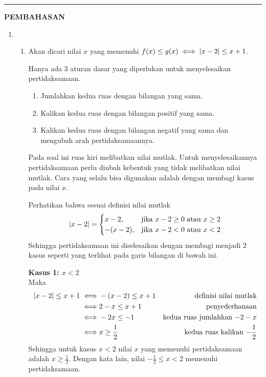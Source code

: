 \vspace{0.2cm}\hrule height 1pt\vspace{0.5cm}


\begin{center}
    \textbf{\large{PEMBAHASAN}}
\end{center}
\begin{enumerate}[leftmargin=*, label={\arabic*}.]
\item
    \begin{enumerate}[label={\alph*}.]
    \item Akan dicari nilai $x$ yang memenuhi
    $f(x) \leq g(x) \iff \lvert x-2\rvert \leq x+1$.

    Hanya ada 3 aturan dasar yang diperlukan untuk menyelesaikan pertidaksamaan.
        \begin{enumerate}[label={\arabic*})]
        \item Jumlahkan kedua ruas dengan bilangan yang sama.
        \item Kalikan kedua ruas dengan bilangan positif yang sama.
        \item Kalikan kedua ruas dengan bilangan negatif yang sama dan 
        mengubah arah pertidaksamaannya.
        \end{enumerate}
    Pada soal ini ruas kiri melibatkan nilai mutlak. Untuk menyelesaikannya 
    pertidaksamaan perlu diubah kebentuk yang tidak melibatkan nilai mutlak. 
    Cara yang selalu bisa digunakan adalah dengan membagi kasus pada nilai $x$.
    
    Perhatikan bahwa sesuai definisi nilai mutlak
    \[
    \lvert x-2\rvert = 
    \begin{cases}
        x-2, &\text{jika $x-2 \geq 0$ atau $x \geq 2$}\\
        -(x-2), &\text{jika $x-2 < 0$ atau $x < 2$}
    \end{cases}
    \]
    Sehingga pertidaksamaan ini diselesaikan dengan membagi menjadi 2 kasus 
    seperti yang terlihat pada garis bilangan di bawah ini.
    
    

    \textbf{Kasus 1: $x < 2$}\\
    Maka
    \begin{align*}
        \lvert x-2\rvert \leq x+1
        \iff &-(x-2) \leq x+1 
        &\text{definisi nilai mutlak} \\
        \iff &2-x \leq x+1
        &\text{penyederhanaan}\\
        \iff &-2x \leq -1
        &\text{kedua ruas jumlahkan $-2-x$}\\
        \iff &x \geq \frac{1}{2}
        &\text{kedua ruas kalikan $-\frac{1}{2}$}
    \end{align*}
    Sehingga untuk kasus $x < 2$ nilai $x$ yang memenuhi pertidaksamaan adalah 
    $x \geq \frac{1}{2}$. Dengan kata lain, nilai $-\frac{1}{2} \leq x < 2$ 
    memenuhi pertidaksamaan.
    

\end{enumerate}
\end{enumerate}
